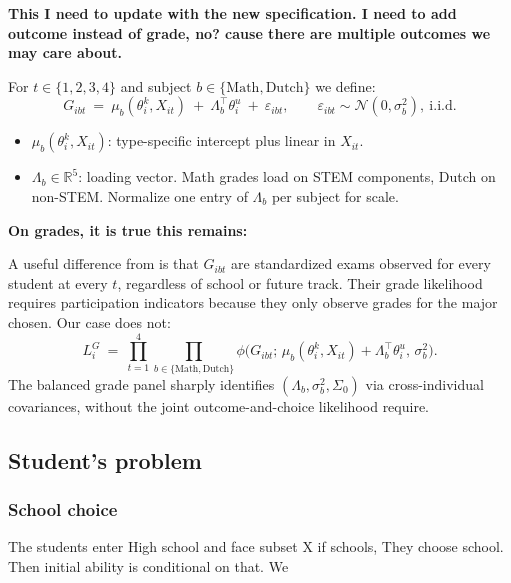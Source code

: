 \documentclass{article}
\begin{document}
\textbf{This I need to update with the new specification. I need to add outcome instead of grade, no? cause there are multiple outcomes we may care about.}

For $t \in \{1, 2, 3, 4\}$ and subject $b \in \{\mathrm{Math}, \mathrm{Dutch}\}$ we define:
\begin{equation}
  G_{ibt} \ =\ \mu_b(\theta^k_i, X_{it}) \ +\ \Lambda_b^\top \theta^u_i \ +\ \varepsilon_{ibt},
  \qquad \varepsilon_{ibt} \sim \mathcal{N}(0, \sigma_b^2),\ \mathrm{i.i.d.}
  \label{eq:grade}
\end{equation}
\begin{itemize}
  \item $\mu_b(\theta^k_i, X_{it})$: type-specific intercept plus linear in $X_{it}$.
  \item $\Lambda_b \in \mathbb{R}^{5}$: loading vector. Math grades load on STEM components, Dutch on non-STEM. Normalize one entry of $\Lambda_b$ per subject for scale.
\end{itemize}

\textbf{On grades, it is true this remains:}

A useful difference from \citet{arcidiacono2025college} is that $G_{ibt}$ are standardized exams observed for every student at every $t$, regardless of school or future track. Their grade likelihood requires participation indicators because they only observe grades for the major chosen. Our case does not:
\begin{equation}
  L^G_i \ =\ \prod_{t=1}^4 \prod_{b \in \{\mathrm{Math}, \mathrm{Dutch}\}} \phi\!\big(G_{ibt};\, \mu_b(\theta^k_i, X_{it}) + \Lambda_b^\top \theta^u_i,\, \sigma_b^2\big).
  \label{eq:grade_lik}
\end{equation}
The balanced grade panel sharply identifies $(\Lambda_b, \sigma_b^2, \Sigma_0)$ via cross-individual covariances, without the joint outcome-and-choice likelihood \citet{arcidiacono2025college} require. 


\subsection{Student's problem}

\subsubsection{School choice}
The students enter High school and face subset X if schools, They choose school. Then initial ability is conditional on that. We 
\end{document}
